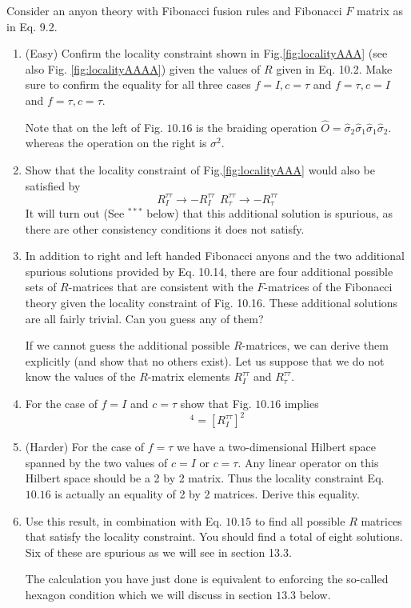 Consider an anyon theory with Fibonacci fusion rules and Fibonacci $F$ matrix as in Eq. 9.2.
\begin{enumerate}
\item (Easy) Confirm the locality constraint shown in Fig.\ref{fig:localityAAA} (see also Fig. \ref{fig:localityAAAA}) given the values of $R$ given in Eq. 10.2. Make sure to confirm the equality for all three cases $f=I,c=\tau $ and $f=\tau ,c=I$ and $f=\tau ,c=\tau $. 

Note that on the left of Fig. $10.16$ is the braiding operation $\hat{O} =\hat{\sigma }_{2}\hat{\sigma }_{1}\hat{\sigma }_{1}\hat{\sigma }_{2}$. whereas the operation on the right is $\sigma ^{2}$.
\item Show that the locality constraint of Fig.\ref{fig:localityAAA} would also be satisfied by\begin{equation*}
R_{I}^{\tau \tau }\rightarrow -R_{I}^{\tau \tau } \ \ R_{\tau }^{\tau \tau }\rightarrow -R_{\tau }^{\tau \tau }
\end{equation*}It will turn out (See $^{***}$ below) that this additional solution is spurious, as there are other consistency conditions it does not satisfy.
\item In addition to right and left handed Fibonacci anyons and the two additional spurious solutions provided by Eq. 10.14, there are four additional possible sets of $R$-matrices that are consistent with the $F$-matrices of the Fibonacci theory given the locality constraint of Fig. 10.16. These additional solutions are all fairly trivial. Can you guess any of them?

If we cannot guess the additional possible $R$-matrices, we can derive them explicitly (and show that no others exist). Let us suppose that we do not know the values of the $R$-matrix elements $R_{I}^{\tau \tau }$ and $R_{\tau }^{\tau \tau }$.
\item For the case of $f=I$ and $c=\tau $ show that Fig. $10.16$ implies\begin{equation*}
[R_{\tau }^{\tau \tau } ]^{4} =[R_{I}^{\tau \tau } ]^{2}
\end{equation*}
\item (Harder) For the case of $f=\tau $ we have a two-dimensional Hilbert space spanned by the two values of $c=I$ or $c=\tau $. Any linear operator on this Hilbert space should be a 2 by 2 matrix. Thus the locality constraint Eq. $10.16$ is actually an equality of 2 by 2 matrices. Derive this equality.
\item Use this result, in combination with Eq. $10.15$ to find all possible $R$ matrices that satisfy the locality constraint. You should find a total of eight solutions. Six of these are spurious as we will see in section 13.3.

The calculation you have just done is equivalent to enforcing the so-called hexagon condition which we will discuss in section $13.3$ below.
\end{enumerate}

